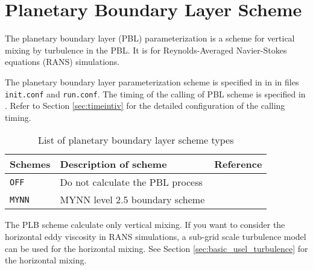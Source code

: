 
\section{Planetary Boundary Layer Scheme} \label{sec:basic_usel_pbl}

The planetary boundary layer (PBL) parameterization is a scheme for vertical mixing by turbulence in the PBL.
It is for Reynolds-Averaged Navier-Stokes equations (RANS) simulations.

The planetary boundary layer parameterization scheme is specified in  in  in files \verb|init.conf| and \verb|run.conf|. The timing of the calling of PBL scheme is specified in . Refer to Section \ref{sec:timeintiv} for the detailed configuration of the calling timing.

\begin{table}[h]
\begin{center}
  \caption{List of planetary boundary layer scheme types}
  \label{tab:nml_atm_bl}
  \begin{tabularx}{150mm}{lXX} \hline
    \rowcolor[gray]{0.9}  Schemes & Description of scheme & Reference\\ \hline
      \verb|OFF|          & Do not calculate the PBL process &  \\
      \verb|MYNN|         & MYNN level 2.5 boundary scheme & \citet{my_1982,nakanishi_2004} \\
    \hline
  \end{tabularx}
\end{center}
\end{table}

The PLB scheme calculate only vertical mixing.
If you want to consider the horizontal eddy viscosity in RANS simulations,
a sub-grid scale turbulence model can be used for the horizontal mixing.
See Section \ref{sec:basic_usel_turbulence} for the horizontal mixing.
